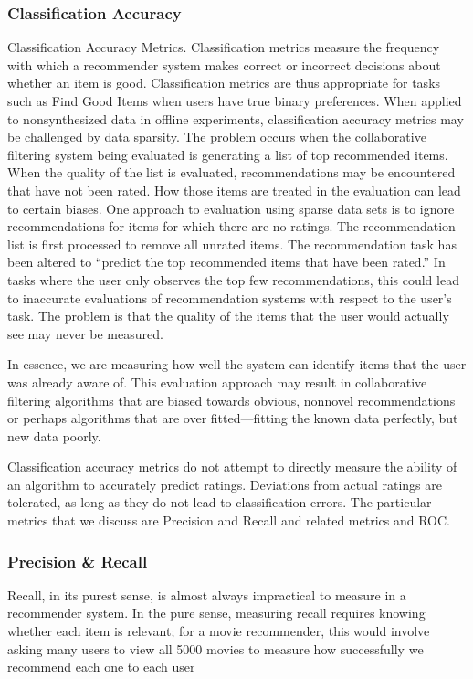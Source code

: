 \subsubsection{Classification Accuracy}
Classification Accuracy Metrics. Classification metrics measure the
frequency with which a recommender system makes correct or incorrect decisions
about whether an item is good. Classification metrics are thus appropriate
for tasks such as Find Good Items when users have true binary preferences.
When applied to nonsynthesized data in offline experiments, classification
accuracy metrics may be challenged by data sparsity. The problem occurs when
the collaborative filtering system being evaluated is generating a list of top
recommended items. When the quality of the list is evaluated, recommendations
may be encountered that have not been rated. How those items are treated in
the evaluation can lead to certain biases.
One approach to evaluation using sparse data sets is to ignore recommendations
for items for which there are no ratings. The recommendation list is first
processed to remove all unrated items. The recommendation task has been altered
to “predict the top recommended items that have been rated.” In tasks
where the user only observes the top few recommendations, this could lead to
inaccurate evaluations of recommendation systems with respect to the user’s task. The problem is that the quality of the items that the user would actually
see may never be measured.

In essence, we are measuring how well the system
can identify items that the user was already aware of. This evaluation approach
may result in collaborative filtering algorithms that are biased towards obvious,
nonnovel recommendations or perhaps algorithms that are over fitted—fitting
the known data perfectly, but new data poorly.

Classification accuracy metrics do not attempt to directly measure the ability
of an algorithm to accurately predict ratings. Deviations from actual ratings
are tolerated, as long as they do not lead to classification errors. The particular
metrics that we discuss are Precision and Recall and related metrics and ROC.

\subsubsection{Precision \& Recall}

Recall, in its purest sense, is almost always impractical to measure in a
recommender system. In the pure sense, measuring recall requires knowing
whether each item is relevant; for a movie recommender, this would involve
asking many users to view all 5000 movies to measure how successfully we recommend
each one to each user


